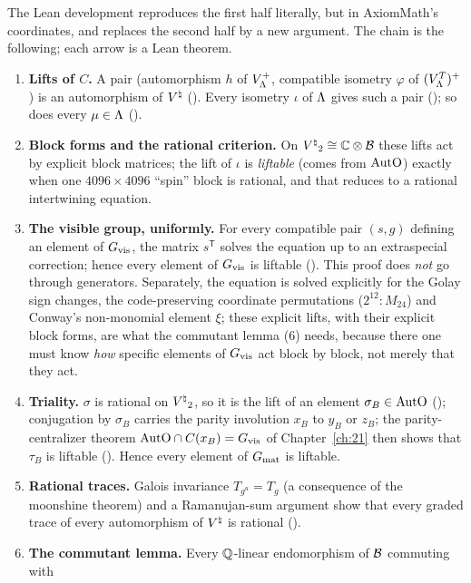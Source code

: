 The Lean development reproduces the first half literally, but in AxiomMath's coordinates, and replaces the
second half by a new argument.  The chain is the following; each arrow is a Lean theorem.
\begin{enumerate}[label=(\arabic*)]
\item \textbf{Lifts of $C$.}  A pair (automorphism $h$ of $V_{\Lambda}^+$, compatible isometry $\varphi$ of
  $(V_{\Lambda}^T)^+$) is an automorphism of ${V^{\natural}}$ ().  Every isometry $\iota$ of ${\Lambda}$ gives
  such a pair (); so does every $\mu\in{\Lambda}$ ().
\item \textbf{Block forms and the rational criterion.}  On ${V^{\natural}}_2\cong{\mathbb{C}}\otimes\mathcal{B}$ these lifts act by
  explicit block matrices; the lift of $\iota$ is \emph{liftable} (comes from $\mathrm{AutO}$) exactly when one
  $4096\times4096$ ``spin'' block is rational, and that reduces to a rational intertwining equation.
\item \textbf{The visible group, uniformly.}  For every compatible pair $(s,g)$ defining an element of
  $G_{\mathrm{vis}}$, the matrix $s^{\mathsf T}$ solves the equation up to an extraspecial correction; hence every element
  of $G_{\mathrm{vis}}$ is liftable ().  This proof does \emph{not} go through generators.
  Separately, the equation is solved explicitly for the Golay sign changes, the code-preserving coordinate permutations
  ($2^{12}{:}M_{24}$) and Conway's non-monomial element $\xi$; these explicit lifts, with their explicit block forms, are
  what the commutant lemma (6) needs, because there one must know \emph{how} specific elements of $G_{\mathrm{vis}}$ act
  block by block, not merely that they act.
\item \textbf{Triality.}  $\sigma$ is rational on ${V^{\natural}}_2$, so it is the lift of an element $\sigma_B\in\mathrm{AutO}$
  (); conjugation by $\sigma_B$ carries the parity involution $x_B$ to $y_B$ or $z_B$; the
  parity-centralizer theorem $\mathrm{AutO}\cap C(x_B)=G_{\mathrm{vis}}$ of Chapter~\ref{ch:21} then shows that
  $\tau_B$ is liftable ().  Hence every element of $G_{\mathrm{mat}}$ is liftable.
\item \textbf{Rational traces.}  Galois invariance $T_{g^u}=T_g$ (a consequence of the moonshine theorem) and a
  Ramanujan-sum argument show that every graded trace of every automorphism of ${V^{\natural}}$ is rational
  ().
\item \textbf{The commutant lemma.}  Every ${\mathbb{Q}}$-linear endomorphism of $\mathcal{B}$ commuting with

\end{enumerate}
